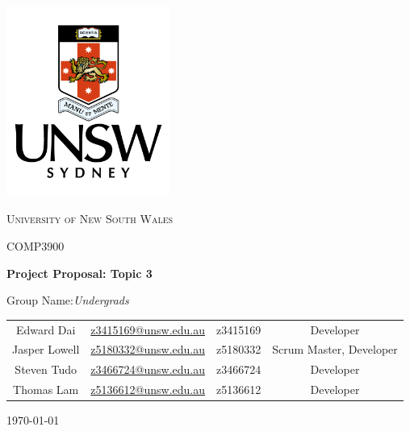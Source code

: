 \documentclass[12pt,a4paper]{article}
\begin{document}
\begin{titlepage}
  \centering
  \includegraphics[width=0.4\textwidth]{../unsw.png}\par\vspace{1cm}
  {\scshape\LARGE University of New South Wales \par}
  \vspace{0.5cm}
  {\scshape\Large COMP3900 \par}
  \vspace{0.5cm}
  {\huge\bfseries Project Proposal: Topic 3 \par}
  \vspace{1cm}
  {\Large Group Name:\itshape Undergrads \par}
  \vspace{2cm}
  \begin{center}
    \begin{tabular}{c c c c}
      Edward Dai & \href{mailto:z3415169@unsw.edu.au}{z3415169@unsw.edu.au} &
      z3415169 & Developer \\
      Jasper Lowell & \href{mailto:z5180332@unsw.edu.au}{z5180332@unsw.edu.au} &
      z5180332 & Scrum Master, Developer \\
      Steven Tudo & \href{mailto:z3466724@unsw.edu.au}{z3466724@unsw.edu.au} &
      z3466724 & Developer \\
      Thomas Lam & \href{mailto:z5136612@unsw.edu.au}{z5136612@unsw.edu.au} &
      z5136612 & Developer
    \end{tabular}
  \end{center}
  \vfill
  {\large \today\par}
\end{titlepage}

\newpage
\setlength{\parindent}{0pt}
\setlength{\parskip}{\baselineskip}

\begin{abstract}
  An easy to use and intuitive web application that aims to connect clients and providers of accommodations in New South Wales, Australia based on preferences such as location, local utilities, ratings, and price.
\end{abstract}
\bigskip
\bigskip
\end{document}
